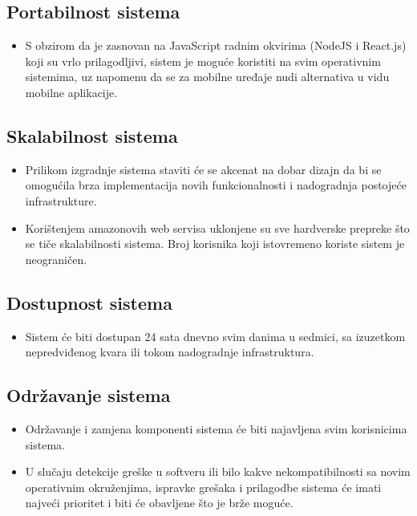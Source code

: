 \subsection{Portabilnost sistema}
\begin{itemize}
    \item S obzirom da je zasnovan na JavaScript radnim okvirima (NodeJS i React.js) koji su vrlo prilagodljivi, sistem je moguće koristiti na svim operativnim sistemima, uz napomenu da se za mobilne uređaje nudi alternativa u vidu mobilne aplikacije.
\end{itemize}

\subsection{Skalabilnost sistema}
\begin{itemize}
    \item Prilikom izgradnje sistema staviti će se akcenat na dobar dizajn da bi se omogućila brza implementacija novih funkcionalnosti i nadogradnja postojeće infrastrukture.
    \item Korištenjem amazonovih web servisa uklonjene su sve hardverske prepreke što se tiče skalabilnosti sistema. Broj korisnika koji istovremeno koriste sistem je neograničen.
\end{itemize}

\subsection{Dostupnost sistema}
\begin{itemize}
    \item Sistem će biti dostupan 24 sata dnevno svim danima u sedmici, sa izuzetkom nepredviđenog kvara ili tokom nadogradnje infrastruktura.
\end{itemize}

\subsection{Održavanje sistema}
\begin{itemize}
    \item Održavanje i zamjena komponenti sistema će biti najavljena svim korisnicima sistema.
    \item U slučaju detekcije greške u softveru ili bilo kakve nekompatibilnosti sa novim operativnim okruženjima, ispravke grešaka i prilagodbe sistema će imati najveći prioritet i biti će obavljene što je brže moguće.
\end{itemize}

